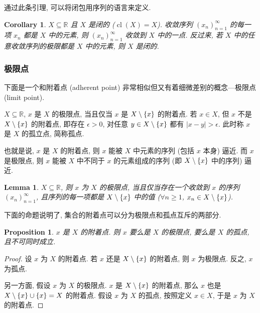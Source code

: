 \documentclass[UTF8]{ctexart}
\theoremstyle{mystyle}
\newtheorem{lemma}{Lemma}[section]
\newtheorem{proposition}{Proposition}[section]
\theoremstyle{myremark}
\theoremstyle{plain}
\newtheorem{corollary}{Corollary}[section]
\newcommand{\R}{\mathbb R}
\DeclarePairedDelimiter\set{\{}{\}}
\DeclareMathOperator{\cl}{cl}
\begin{document}
通过此条引理, 可以将闭包用序列的语言来定义.

\begin{corollary}
    $ X \subseteq \R $ 且 $ X $ 是闭的 ($ \cl(X) = X $). 收敛序列 $ (x_n)_{n = 1}^\infty $ 的每一项 $ x_n $ 都是 $ X $ 中的元素, 则 $ (x_n)_{n = 1}^\infty $ 收敛到 $ X $ 中的一点. 反过来, 若 $ X $ 中的任意收敛序列的极限都是 $ X $ 中的元素, 则 $ X $ 是闭的.
\end{corollary}

\subsubsection{极限点}
下面是一个和附着点 (adherent point) 非常相似但又有着细微差别的概念---极限点 (limit point).

\begin{definition}
    $ X \subseteq \R $, $ x $ 是 $ X $ 的极限点, 当且仅当 $ x $ 是 $ X \setminus \set{x} $ 的附着点. 若 $ x \in X $, 但 $ x $ 不是 $ X \setminus \set{x} $ 的附着点, 即存在 $ \epsilon > 0 $, 对任意 $ y \in X \setminus \set{x} $ 都有 $ |x - y| > \epsilon $. 此时称 $ x $ 是 $ X $ 的孤立点, 简称孤点.
\end{definition}

也就是说, $ x $ 是 $ X $ 的附着点, 则 $ x $ 能被 $ X $ 中元素的序列 (包括 $ x $ 本身) 逼近. 而 $ x $ 是极限点, 则 $ x $ 能被 $ X $ 中不同于 $ x $ 的元素组成的序列 (即 $ X \setminus \set{x} $ 中的序列) 逼近. 

\begin{lemma}
    $ X \subseteq \R $, 则 $ x $ 为 $ X $ 的极限点, 当且仅当存在一个收敛到 $ x $ 的序列 $ (x_n)_{n = 1}^\infty $, 且序列的每一项都是 $ X \setminus \set{x} $ 中的值 ($ \forall n \geqslant 1 $, $ x_n \in X \setminus \set{x} $).
\end{lemma}

下面的命题说明了, 集合的附着点可以分为极限点和孤点互斥的两部分.
\begin{proposition}
    $ x $ 是 $ X $ 的附着点. 则 $ x $ 要么是 $ X $ 的极限点, 要么是 $ X $ 的孤点, 且不可同时成立.
\end{proposition}

\begin{proof}
    设 $ x $ 为 $ X $ 的附着点. 若 $ x $ 还是 $ X \setminus \set{x} $ 的附着点, 则 $ x $ 为极限点. 反之, $ x $ 为孤点.

    另一方面, 假设 $ x $ 为 $ X $ 的极限点. $ x $ 是 $ X \setminus \set{x} $ 的附着点, 那么 $ x $ 也是 $ X \setminus \set{x} \cup \set{x} = X $ 的附着点. 假设 $ x $ 为 $ X $ 的孤点, 按照定义 $ x \in X $, 于是 $ x $ 为 $ X $ 的附着点.
\end{proof}
\end{document}
